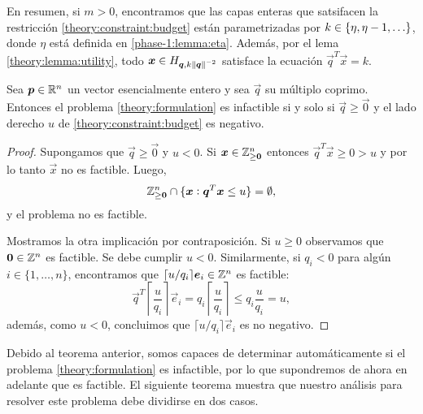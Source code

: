 En resumen, si $m > 0$, encontramos que las capas enteras que satsifacen la restricción
\eqref{theory:constraint:budget} están parametrizadas por $k \in \lbrace \eta, \eta - 1, \ldots \rbrace$,
donde $\eta$ está definida en \ref{phase-1:lemma:eta}. Además, por el lema
\ref{theory:lemma:utility}, todo $\boldsymbol{x} \in H_{\boldsymbol{q}, k\left\lVert \boldsymbol{q} \right\rVert^{-2}}$ satisface la ecuación $\vec{q}^T\vec{x} = k$.
\begin{theorem}
	\label{theory:th:infeasibility}
	Sea $\boldsymbol{p} \in \mathbb{R}^n$ un vector esencialmente entero y sea $\vec{q}$ su múltiplo coprimo.
	Entonces el problema \eqref{theory:formulation} es infactible si y solo si $\vec{q} \geq
	\vec{0}$ y el lado derecho $u$ de \eqref{theory:constraint:budget} es negativo. 
\end{theorem}
\begin{proof}
	Supongamos que $\vec{q} \geq \vec{0}$ y $u < 0$. Si $\boldsymbol{x} \in \mathbb{Z}_{\geq \boldsymbol{0}}^n$
	entonces $\vec{q}^T\vec{x} \geq 0 > u$ y por lo tanto $\vec{x}$ no es factible. Luego,
	\begin{equation*}
		\mathbb{Z}_{\geq \boldsymbol{0}}^{n} \cap \lbrace \boldsymbol{x} \vcentcolon \boldsymbol{q}^T\boldsymbol{x} 
		\leq u \rbrace = \emptyset,
	\end{equation*}
	y el problema no es factible.

	Mostramos la otra implicación por contraposición. Si $u
	\geq 0$ observamos que $\boldsymbol{0} \in \mathbb{Z}^n$ es factible. Se debe cumplir $u < 0$. Similarmente, si
	$q_i < 0$ para algún $i \in \lbrace 1, \ldots, n \rbrace$, encontramos que $\lceil u/q_i
	\rceil\boldsymbol{e}_i \in \mathbb{Z}^n$ es factible:
	\begin{equation*}
		\vec{q}^T\left\lceil \frac{u}{q_i} \right\rceil\vec{e}_i
		= q_i \left\lceil \frac{u}{q_i} \right\rceil
		\leq q_i \frac{u}{q_i} = u,
	\end{equation*}
	además, como $u < 0$, concluimos que $\lceil u/q_i \rceil\vec{e}_i$ es no negativo.
\end{proof}

Debido al teorema anterior, somos capaces de determinar automáticamente si el problema
\eqref{theory:formulation} es infactible, por lo que supondremos de ahora en adelante que es
factible. El siguiente teorema muestra que nuestro análisis para resolver este problema debe
dividirse en dos casos.

